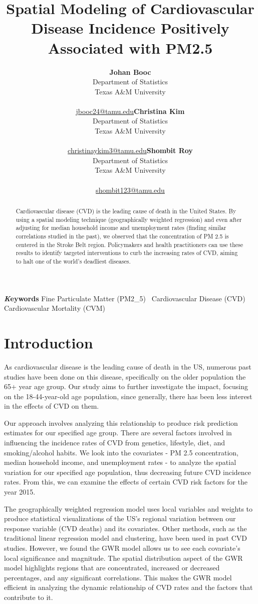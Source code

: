 \documentclass[
]{article}
\title{Spatial Modeling of Cardiovascular Disease Incidence Positively
Associated with PM2.5}
\author{\textbf{Johan Booc}\\Department of Statistics\\Texas A\&M
University\\\\\href{mailto:jbooc24@tamu.edu}{jbooc24@tamu.edu}\asep\textbf{Christina
Kim}\\Department of Statistics\\Texas A\&M
University\\\\\href{mailto:christinaykim3@tamu.edu}{christinaykim3@tamu.edu}\asep\textbf{Shombit
Roy}\\Department of Statistics\\Texas A\&M
University\\\\\href{mailto:shombit123@tamu.edu}{shombit123@tamu.edu}}
\date{}
\begin{document}
\maketitle
\begin{abstract}
Cardiovascular disease (CVD) is the leading cause of death in the United
States. By using a spatial modeling technique (geographically weighted
regression) and even after adjusting for median household income and
unemployment rates (finding similar correlations studied in the past),
we observed that the concentration of PM 2.5 is centered in the Stroke
Belt region. Policymakers and health practitioners can use these results
to identify targeted interventions to curb the increasing rates of CVD,
aiming to halt one of the world's deadliest diseases.
\end{abstract}
{\bfseries \emph Keywords}
\def\sep{\textbullet\ }
Fine Particulate Matter (PM2\_5) \sep Cardiovascular Disease (CVD) \sep 
Cardiovascular Mortality (CVM)


\section{Introduction}\label{sec-intro}

As cardiovascular disease is the leading cause of death in the US,
numerous past studies have been done on this disease, specifically on
the older population the 65+ year age group. Our study aims to further
investigate the impact, focusing on the 18-44-year-old age population,
since generally, there has been less interest in the effects of CVD on
them.~

Our approach involves analyzing this relationship to produce risk
prediction estimates for our specified age group. There are several
factors involved in influencing the incidence rates of CVD from
genetics, lifestyle, diet, and smoking/alcohol habits. We look into the
covariates - PM 2.5 concentration, median household income, and
unemployment rates - to analyze the spatial variation for our specified
age population, thus decreasing future CVD incidence rates. From this,
we can examine the effects of certain CVD risk factors for the year
2015.~

The geographically weighted regression model uses local variables and
weights to produce statistical visualizations of the US's regional
variation between our response variable (CVD deaths) and its covariates.
Other methods, such as the traditional linear regression model and
clustering, have been used in past CVD studies. However, we found the
GWR model allows us to see each covariate's local significance and
magnitude. The spatial distribution aspect of the GWR model highlights
regions that are concentrated, increased or decreased percentages, and
any significant correlations. This makes the GWR model efficient in
analyzing the dynamic relationship of CVD rates and the factors that
contribute to it.~
\end{document}
